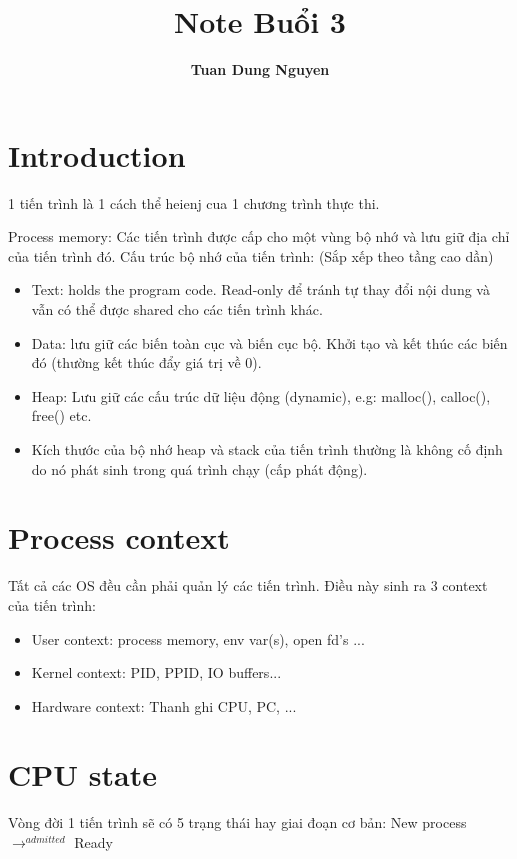 \documentclass[12pt,a4paper]{article}
\title{\textbf{Note Buổi 3}}
\author{\textbf{Tuan Dung Nguyen}}
\begin{document}
	\maketitle
	\tableofcontents
	\newpage
	\section{Introduction}
	\par 1 tiến trình là 1 cách thể heienj cua 1 chương trình thực thi.
	\par Process memory: Các tiến trình được cấp cho một vùng bộ nhớ và lưu giữ địa chỉ của tiến trình đó. Cấu trúc bộ nhớ của tiến trình: (Sắp xếp theo tầng cao dần)
	\begin{itemize}
		\item Text: holds the program code. Read-only để tránh tự thay đổi nội dung và vẫn có thể được shared cho các tiến trình khác.
		\item Data: lưu giữ các biến toàn cục và biến cục bộ. Khởi tạo và kết thúc các biến đó (thường kết thúc đẩy giá trị về 0).
		\item Heap: Lưu giữ các cấu trúc dữ liệu động (dynamic), e.g: malloc(), calloc(), free() etc.
		\item Kích thước của bộ nhớ heap và stack của tiến trình thường là không cố định do nó phát sinh trong quá trình chạy (cấp phát động).
	\end{itemize}
	\section{Process context}
	\par Tất cả các OS đều cần phải quản lý các tiến trình. Điều này sinh ra 3 context của tiến trình:
	\begin{itemize}
		\item User context: process memory, env var(s), open fd's ...
		\item Kernel context: PID, PPID, IO buffers...
		\item Hardware context: Thanh ghi CPU, PC, ...
	\end{itemize}
	\section{CPU state}
	\par Vòng đời 1 tiến trình sẽ có 5 trạng thái hay giai đoạn cơ bản: New process $\rightarrow^{admitted}$ Ready
\end{document}
